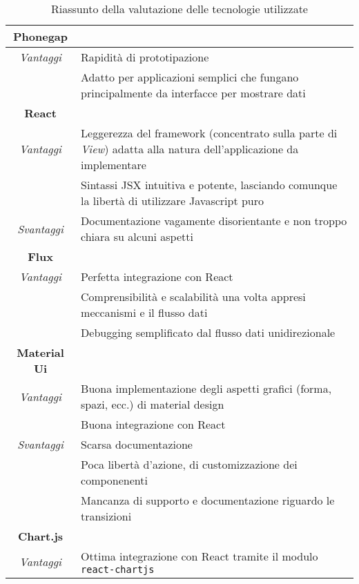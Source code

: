 \begin{table} [H] \centering
\begin{tabularx}{\textwidth}{|c|X|}
\hline
\textbf{Phonegap} & \\ \hline
\textit{Vantaggi}
& Rapidità di prototipazione \\ \hline
& Adatto per applicazioni semplici che fungano principalmente da interfacce per mostrare dati \\ \hline \hline
\textbf{React} & \\ \hline
\textit{Vantaggi}
& Leggerezza del framework (concentrato sulla parte di \textit{View}) adatta alla natura dell'applicazione da implementare \\ \hline
& Sintassi JSX intuitiva e potente, lasciando comunque la libertà di utilizzare Javascript puro \\ \hline
\textit{Svantaggi}
& Documentazione vagamente disorientante e non troppo chiara su alcuni aspetti \\ \hline \hline
\textbf{Flux} & \\ \hline
\textit{Vantaggi}
& Perfetta integrazione con React \\ \hline
& Comprensibilità e scalabilità una volta appresi meccanismi e il flusso dati \\ \hline
& Debugging semplificato dal flusso dati unidirezionale \\ \hline \hline
\textbf{Material Ui} & \\ \hline
\textit{Vantaggi}
& Buona implementazione degli aspetti grafici (forma, spazi, ecc.) di material design \\ \hline
& Buona integrazione con React \\ \hline
\textit{Svantaggi}
& Scarsa documentazione \\ \hline
& Poca libertà d'azione, di customizzazione dei componenenti \\ \hline
& Mancanza di supporto e documentazione riguardo le transizioni \\ \hline \hline
\textbf{Chart.js} & \\ \hline
\textit{Vantaggi}
& Ottima integrazione con React tramite il modulo \texttt{react-chartjs} \\ \hline
\end{tabularx}
\caption{Riassunto della valutazione delle tecnologie utilizzate}
\end{table}
